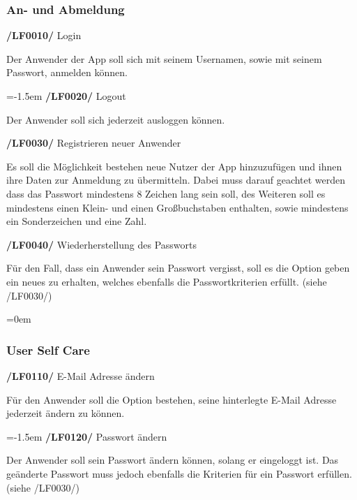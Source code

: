 \documentclass[11pt,a4paper]{report}
\begin{document}
\subsubsection{An- und Abmeldung}

\textbf{/LF0010/} Login
\par
\begingroup
\leftskip=1cm
\noindent Der Anwender der App soll sich mit seinem Usernamen, sowie mit seinem Passwort, anmelden können.\\
\par
\endgroup

\leftskip=-1.5em
\textbf{/LF0020/} Logout
\par
\begingroup
\leftskip=1cm
\noindent Der Anwender soll sich jederzeit ausloggen können.\\
\par
\endgroup

\textbf{/LF0030/} Registrieren neuer Anwender
\par
\begingroup
\leftskip=1cm
\noindent Es soll die Möglichkeit bestehen neue Nutzer der App hinzuzufügen und ihnen ihre Daten zur Anmeldung zu übermitteln. 
Dabei muss darauf geachtet werden dass das Passwort mindestens 8 Zeichen lang sein soll, des Weiteren soll es mindestens einen Klein- und einen Großbuchstaben enthalten, sowie mindestens ein Sonderzeichen und eine Zahl.\\
\par
\endgroup

\textbf{/LF0040/} Wiederherstellung des Passworts
\par
\begingroup
\leftskip=1cm
\noindent Für den Fall, dass ein Anwender sein Passwort vergisst, soll es die Option geben ein neues zu erhalten, welches ebenfalls die Passwortkriterien erfüllt. 
(siehe /LF0030/)\\
\par
\endgroup

\leftskip=0em
\subsubsection{User Self Care}

\textbf{/LF0110/} E-Mail Adresse ändern
\par
\begingroup
\leftskip=1cm
\noindent Für den Anwender soll die Option bestehen, seine hinterlegte E-Mail Adresse jederzeit ändern zu können.\\
\par
\endgroup

\leftskip=-1.5em
\textbf{/LF0120/} Passwort ändern
\par
\begingroup
\leftskip=1cm
\noindent Der Anwender soll sein Passwort ändern können, solang er eingeloggt ist. 
Das geänderte Passwort muss jedoch ebenfalls die Kriterien für ein Passwort erfüllen. 
(siehe /LF0030/)\\
\par
\endgroup
\end{document}
